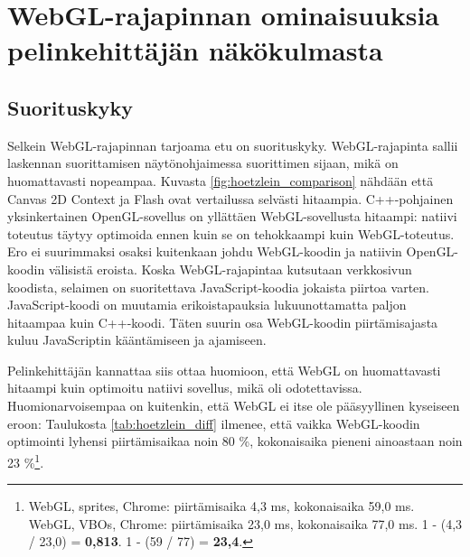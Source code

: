 \section{WebGL-rajapinnan ominaisuuksia pelinkehittäjän näkökulmasta}
\label{sec:materiaali}

\subsection{Suorituskyky}
Selkein WebGL-rajapinnan tarjoama etu on suorituskyky. WebGL-rajapinta sallii laskennan suorittamisen näytönohjaimessa suorittimen sijaan, mikä on huomattavasti nopeampaa. Kuvasta \ref{fig:hoetzlein_comparison} nähdään että Canvas 2D Context ja Flash ovat vertailussa selvästi hitaampia. C++-pohjainen yksinkertainen OpenGL-sovellus on yllättäen WebGL-sovellusta hitaampi: natiivi toteutus täytyy optimoida ennen kuin se on tehokkaampi kuin WebGL-toteutus.\cite{hoetzlein} Ero ei suurimmaksi osaksi kuitenkaan johdu WebGL-koodin ja natiivin OpenGL-koodin välisistä eroista. Koska WebGL-rajapintaa kutsutaan verkkosivun koodista, selaimen on suoritettava JavaScript-koodia jokaista piirtoa varten. JavaScript-koodi on muutamia erikoistapauksia lukuunottamatta paljon hitaampaa kuin C++-koodi\cite{smedberg}. Täten suurin osa WebGL-koodin piirtämisajasta kuluu JavaScriptin kääntämiseen ja ajamiseen\cite{hoetzlein}.

Pelinkehittäjän kannattaa siis ottaa huomioon, että WebGL on huomattavasti hitaampi kuin optimoitu natiivi sovellus, mikä oli odotettavissa. Huomionarvoisempaa on kuitenkin, että WebGL ei itse ole pääsyyllinen kyseiseen eroon: Taulukosta \ref{tab:hoetzlein_diff} ilmenee, että vaikka WebGL-koodin optimointi lyhensi piirtämisaikaa noin 80 \%, kokonaisaika pieneni ainoastaan noin 23 \%\footnote{WebGL, sprites, Chrome: piirtämisaika 4,3 ms, kokonaisaika 59,0 ms. WebGL, VBOs, Chrome: piirtämisaika 23,0 ms, kokonaisaika 77,0 ms. 1 - (4,3 / 23,0) = \textbf{0,813}. 1 - (59 / 77) = \textbf{23,4}.}.



